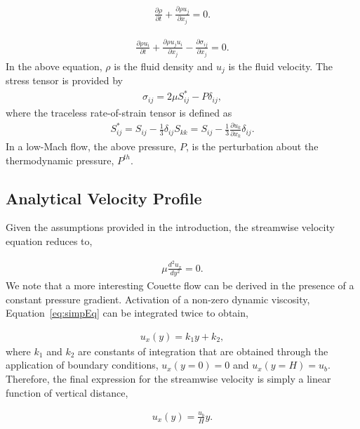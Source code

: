 \documentclass{article}
\begin{document}
\begin{align}
  \frac {\partial \rho }{\partial t} + \frac{ \partial \rho u_j}{\partial x_j} = 0.
\label{eq:contEq}
\end{align} 

\begin{align}
  \frac {\partial \rho u_i }{\partial t} + \frac{ \partial \rho u_j u_i}{\partial x_j} 
-\frac{\partial \sigma_{ij}}{\partial x_j} = 0.
\label{eq:momEq}
\end{align}
%
In the above equation, $\rho$ is the fluid density and $u_j$ is the fluid velocity. 
The stress tensor is provided by
\begin{align}
\sigma_{ij}  = 2 \mu S^*_{ij} - P \delta_{ij},
\end{align}
%
where the traceless rate-of-strain tensor is defined as
\begin{align}
S^*_{ij}  = S_{ij} - \frac{1}{3} \delta_{ij} S_{kk} \nonumber
		     = S_{ij} - \frac{1}{3} \frac{\partial  u_k }{\partial x_k}\delta_{ij}.
\end{align}
In a low-Mach flow, the above pressure, $P$, is the perturbation about the thermodynamic
pressure, $P^{th}$. 

\subsection{Analytical Velocity Profile}
Given the assumptions provided in the introduction, the streamwise velocity equation reduces to,

\begin{align}
   \mu \frac{d^2 u_x}{dy^2} = 0.
\label{eq:simpEq}
\end{align}
We note that a more interesting Couette flow can be derived in the presence of a constant pressure 
gradient. Activation of a non-zero dynamic viscosity, Equation~\ref{eq:simpEq} can be 
integrated twice to obtain,

\begin{align}
  u_x(y) = k_1 y + k_2,
\label{eq:simpEqWithK}
\end{align}
where $k_1$ and $k_2$ are constants of integration that are obtained through the 
application of boundary conditions, $u_x(y=0) = 0$ and  $u_x(y=H) = u_b$. Therefore,
the final expression for the streamwise velocity is simply a linear function of vertical
distance,

\begin{align}
  u_x(y) = \frac{u_b}{H}y.
\label{eq:simpleEqWithoutK}
\end{align}
\end{document}
